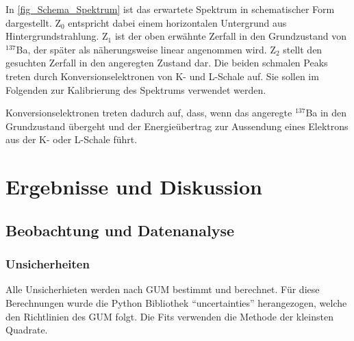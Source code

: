 \documentclass[
	a4paper,
	12pt,
	pagesize,
	ngerman
]{scrartcl}
\begin{document}
	In \cref{fig_Schema_Spektrum} ist das erwartete Spektrum in schematischer Form dargestellt.
	Z$_0$ entspricht dabei einem horizontalen Untergrund aus Hintergrundstrahlung.
	Z$_1$ ist der oben erwähnte Zerfall in den Grundzustand von $^{137}$Ba, der später als näherungsweise linear angenommen wird.
	Z$_2$ stellt den gesuchten Zerfall in den angeregten Zustand dar.
	Die beiden schmalen Peaks treten durch Konversionselektronen von K- und L-Schale auf.
	Sie sollen im Folgenden zur Kalibrierung des Spektrums verwendet werden.

	Konversionselektronen treten dadurch auf, dass, wenn das angeregte $^{137}$Ba in den Grundzustand übergeht und der Energieübertrag zur Aussendung eines Elektrons aus der K- oder L-Schale führt.

	\section{Ergebnisse und Diskussion}


	\subsection{Beobachtung und Datenanalyse}
	\subsubsection{Unsicherheiten}
	Alle Unsicherhieten werden nach GUM bestimmt und berechnet.
	Für diese Berechnungen wurde die Python Bibliothek \enquote{uncertainties} herangezogen, welche den Richtlinien des GUM folgt.
	Die Fits verwenden die Methode der kleinsten Quadrate.
\end{document}
